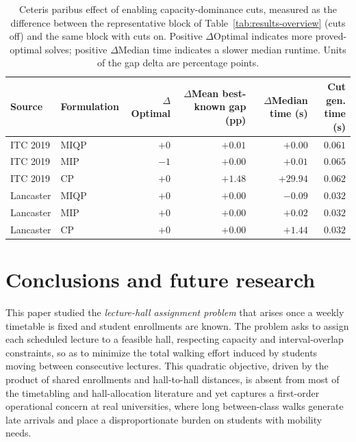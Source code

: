 \documentclass[11pt]{article}
\begin{document}
\begin{table}[t]
\centering
\scriptsize
\begin{tabular}{@{}llrrrr@{}}
\hline
Source & Formulation & $\Delta$Optimal & \makecell{$\Delta$Mean best-known\\gap (pp)} & \makecell{$\Delta$Median\\time (s)} & \makecell{Cut gen.\\time (s)} \\
\hline
ITC 2019 & MIQP & $+0$ & $+0.01$ & $+0.00$ & $0.061$ \\
ITC 2019 & MIP  & $-1$ & $+0.00$ & $+0.01$ & $0.065$ \\
ITC 2019 & CP   & $+0$ & $+1.48$ & $+29.94$ & $0.062$ \\
Lancaster & MIQP & $+0$ & $+0.00$ & $-0.09$ & $0.032$ \\
Lancaster & MIP  & $+0$ & $+0.00$ & $+0.02$ & $0.032$ \\
Lancaster & CP   & $+0$ & $+0.00$ & $+1.44$ & $0.032$ \\
\hline
\end{tabular}
\caption{Ceteris paribus effect of enabling capacity-dominance cuts, measured as the difference between the representative block of Table~\ref{tab:results-overview} (cuts off) and the same block with cuts on. Positive $\Delta$Optimal indicates more proved-optimal solves; positive $\Delta$Median time indicates a slower median runtime. Units of the gap delta are percentage points.}
\label{tab:cap-dominance-delta}
\end{table}


\section{Conclusions and future research}
\label{sec:conclusions}

This paper studied the \emph{lecture-hall assignment problem} that arises once a weekly timetable is fixed and student enrollments are known. The problem asks to assign each scheduled lecture to a feasible hall, respecting capacity and interval-overlap constraints, so as to minimize the total walking effort induced by students moving between consecutive lectures. This quadratic objective, driven by the product of shared enrollments and hall-to-hall distances, is absent from most of the timetabling and hall-allocation literature and yet captures a first-order operational concern at real universities, where long between-class walks generate late arrivals and place a disproportionate burden on students with mobility needs.
\end{document}
